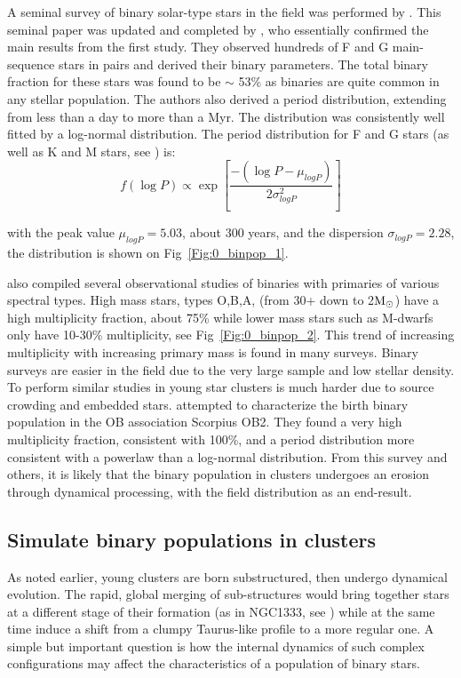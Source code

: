 A seminal survey of binary solar-type stars in the field was performed by \cite{DM91}. This seminal paper was updated and completed by \cite{Raghavan2010}, who essentially confirmed the main results from the first study. They observed hundreds of F and G main-sequence stars in pairs and derived their binary parameters. The total binary fraction for these stars was found to be $\sim$ 53\% as binaries are quite common in any stellar population.
  The authors also derived a period distribution, extending from less than a day to more than a Myr. The distribution was consistently well fitted by a log-normal distribution. The period distribution for F and G stars (as well as K and M stars, see \citealt{Fischer1992}) is:
\begin{equation}
f( \log{P})\propto \exp \left[ \frac{- ( \log{P} - \mu_{logP})}{ 2 \sigma_{logP}^2} \right]
\end{equation}

with the peak value $\mu_{logP} = 5.03$, about 300 years, and the dispersion $\sigma_{logP} = 	2.28$, the distribution is shown on Fig~\ref{Fig:0_binpop_1}.

\cite{Raghavan2010} also compiled several observational studies of binaries with primaries of various spectral types. High mass stars, types O,B,A, (from 30+ down to 2${\textrm{M}_\odot}$) have a high multiplicity fraction, about 75\%  while lower mass stars such as M-dwarfs only have 10-30\% multiplicity, see Fig~\ref{Fig:0_binpop_2}. This trend of increasing multiplicity with increasing primary mass is found in many surveys.
Binary surveys are easier in the field due to the very large sample and low stellar density. To perform similar studies in young star clusters is much harder due to source crowding and embedded stars. \cite{Kouwenhoven2007} attempted to characterize the birth binary population in the OB association Scorpius OB2. They found a very high multiplicity fraction, consistent with 100\%, and a period distribution more consistent with a powerlaw than a log-normal distribution. From this survey and others, it is likely that the binary population in clusters undergoes an erosion through dynamical processing, with the field distribution as an end-result.

\subsection{Simulate binary populations in clusters}

As noted earlier, young clusters are born substructured, then undergo dynamical evolution. The rapid, global  merging of sub-structures would bring together stars at a different stage of their  formation (as in NGC1333, see \citealt{Foster2015}) while at the same time induce a shift from a clumpy Taurus-like profile to a more regular one. A simple but important question is how the internal dynamics of such complex configurations may affect the  characteristics of a population of binary stars. 

